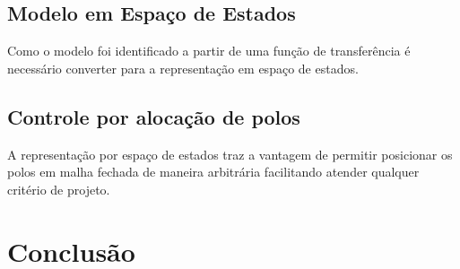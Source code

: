 \documentclass[a4paper,11pt]{article}
\begin{document}
\subsection{Modelo em Espaço de Estados}
Como o modelo foi identificado a partir de uma função de transferência é necessário converter para a representação em espaço de estados.

\subsection{Controle por alocação de polos}
A representação por espaço de estados traz a vantagem de permitir posicionar os polos em malha fechada de maneira arbitrária facilitando atender qualquer critério de projeto.

\section{Conclusão}





\end{document}
